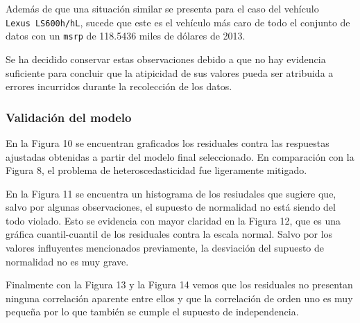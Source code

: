 \documentclass[11pt]{article}
\begin{document}
Además de que una situación similar se presenta para el caso del
vehículo \texttt{Lexus\ LS600h/hL}, sucede que este es el vehículo más
caro de todo el conjunto de datos con un \texttt{msrp} de 118.5436 miles
de dólares de 2013.

Se ha decidido conservar estas observaciones debido a que no hay
evidencia suficiente para concluir que la atipicidad de sus valores
pueda ser atribuida a errores incurridos durante la recolección de los
datos.

    \hypertarget{validaciuxf3n-del-modelo}{%
\subsubsection{Validación del modelo}\label{validaciuxf3n-del-modelo}}

    \begin{center}
    \end{center}
    
    
    En la Figura 10 se encuentran graficados los residuales contra las
respuestas ajustadas obtenidas a partir del modelo final seleccionado.
En comparación con la Figura 8, el problema de heteroscedasticidad fue
ligeramente mitigado.

    \begin{center}
    \end{center}
    
    
    En la Figura 11 se encuentra un histograma de los resiudales que sugiere
que, salvo por algunas observaciones, el supuesto de normalidad no está
siendo del todo violado. Esto se evidencia con mayor claridad en la
Figura 12, que es una gráfica cuantil-cuantil de los residuales contra
la escala normal. Salvo por los valores influyentes mencionados
previamente, la desviación del supuesto de normalidad no es muy grave.

    \begin{center}
    \end{center}
    
    
    Finalmente con la Figura 13 y la Figura 14 vemos que los residuales no
presentan ninguna correlación aparente entre ellos y que la correlación
de orden uno es muy pequeña por lo que también se cumple el supuesto de
independencia.
\end{document}
